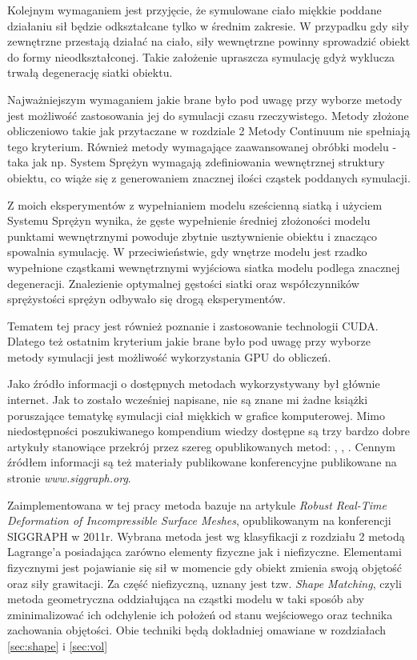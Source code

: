 Kolejnym wymaganiem jest przyjęcie, że symulowane ciało miękkie poddane
działaniu sił będzie odkształcane tylko w średnim zakresie. W
przypadku gdy siły zewnętrzne przestają działać na ciało, siły wewnętrzne
powinny sprowadzić obiekt do formy nieodkształconej. Takie założenie upraszcza
symulację gdyż wyklucza trwałą degenerację siatki obiektu.

Najważniejszym wymaganiem jakie brane było pod uwagę przy wyborze metody jest możliwość
zastosowania jej do symulacji czasu rzeczywistego. Metody złożone obliczeniowo takie
jak przytaczane w rozdziale 2 Metody Continuum nie spełniają tego kryterium.
Również metody wymagające zaawansowanej obróbki modelu - taka jak np. System
Sprężyn wymagają zdefiniowania wewnętrznej struktury obiektu, co wiąże się z
generowaniem znacznej ilości cząstek poddanych symulacji. 

Z moich eksperymentów z wypełnianiem modelu sześcienną siatką i użyciem Systemu Sprężyn wynika, że
gęste wypełnienie średniej złożoności modelu punktami wewnętrznymi powoduje
zbytnie usztywnienie obiektu i znacząco spowalnia symulację. W przeciwieństwie,
gdy wnętrze modelu jest rzadko wypełnione cząstkami wewnętrznymi wyjściowa
siatka modelu podlega znacznej degeneracji. Znalezienie optymalnej gęstości
siatki oraz współczynników sprężystości sprężyn odbywało się drogą eksperymentów.

Tematem tej pracy jest również poznanie i zastosowanie technologii CUDA. Dlatego też
ostatnim kryterium jakie brane było pod uwagę przy wyborze metody symulacji jest
możliwość wykorzystania GPU do obliczeń.

Jako źródło informacji o dostępnych metodach wykorzystywany był głównie
internet. Jak to zostało wcześniej napisane, nie są znane mi żadne książki
poruszające tematykę symulacji ciał miękkich w grafice komputerowej. Mimo
niedostępności poszukiwanego kompendium wiedzy dostępne są trzy bardzo dobre
artykuły stanowiące przekrój przez szereg opublikowanych metod: \cite{TR97-19},
	\cite{pbdo}, \cite{survey}. Cennym źródłem informacji są też materiały
	publikowane konferencyjne publikowane na stronie \textit{www.siggraph.org}.

Zaimplementowana w tej pracy metoda bazuje na artykule \textit{Robust
	Real-Time Deformation of Incompressible Surface Meshes}\cite{diziol},
opublikowanym na konferencji SIGGRAPH w 2011r. Wybrana metoda jest wg
klasyfikacji z rozdziału 2 metodą Lagrange'a posiadająca zarówno elementy
fizyczne jak i niefizyczne. Elementami fizycznymi jest pojawianie się sił w
momencie gdy obiekt zmienia swoją objętość oraz siły grawitacji. Za część
niefizyczną, uznany jest tzw. \textit{Shape Matching}, czyli metoda geometryczna
oddziałująca na cząstki modelu w taki sposób aby zminimalizować ich odchylenie
ich położeń od stanu wejściowego oraz technika zachowania objętości. Obie
techniki będą dokładniej omawiane w rozdziałach \ref{sec:shape} i \ref{sec:vol}

